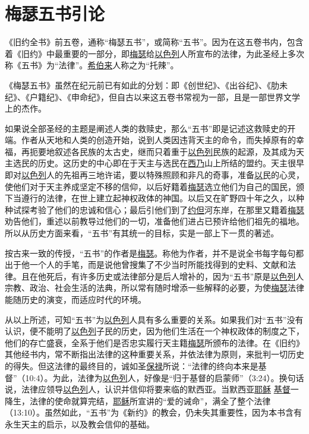 \chapter{梅瑟五书引论}

《旧约全书》前五卷，通称“梅瑟五书”，或简称“五书”。因为在这五卷书内，包含着《旧约》中最重要的一部分，即\uline{梅瑟}给\uline{以色列}人所宣布的法律，为此圣经上多次称《五书》为“法律”。\uline{希伯来}人称之为“托辣”。

《梅瑟五书》虽然在纪元前已有如此的分划：即《创世纪》、《出谷纪》、《肋未纪》、《户籍纪》、《申命纪》，但自古以来这五卷书常视为一部，且是一部世界文学上的杰作。

如果说全部圣经的主题是阐述人类的救赎史，那么“五书”即是记述这救赎史的开端。作者从天地和人类的创造开始，说到人类因违背天主的命令，而失掉原有的幸福，再扼要地叙述各民族的太古史，继而只着重于\uline{以色列}民族的起源，及其成为天主选民的历史。这历史的中心即在于天主与选民在\uline{西乃}山上所结的盟约。天主很早即对\uline{以色列}人的先祖再三地许诺，要以特殊照顾和非凡的奇事，准备\uline{以}民的心灵，使他们对于天主养成坚定不移的信仰，以后好籍着\uline{梅瑟}选立他们为自己的国民，颁下当遵行的法律，在世上建立起神权政体的神国。以后又在旷野四十年之久，以种种试探考验了他们的忠诚和信心；最后引他们到了\uline{约但}河东岸，在那里又籍着\uline{梅瑟}劝告他们，重述以前教导过他们的一切，准备他们进占已预许给他们祖先的福地。所以从历史方面来看，“五书”有其统一的目标，实是一部上下一贯的著述。

按古来一致的传授，“五书”的作者是\uline{梅瑟}。称他为作者，并不是说全书每字每句都出于他一个人的手笔，而是说他曾搜集了不少当时所能找得到的史料、文献和法律。且在他死后，有许多历史或法律部分是后人增补的，因为“五书”原是\uline{以色列}人宗教、政治、社会生活的法典，所以常有随时增添一些解释的必要，为使\uline{梅瑟}法律能随历史的演变，而适应时代的环境。

从以上所述，可知“五书”为\uline{以色列}人具有多么重要的关系。如果我们对“五书”没有认识，便不能明了\uline{以色列}子民的历史，因为他们生活在一个神权政体的制度之下，他们的存亡盛衰，全系于他们是否忠实履行天主籍\uline{梅瑟}所颁布的法律。在《旧约》其他经书内，常不断指出法律的这种重要关系，并依法律为原则，来批判一切历史的得失。但这法律的最终目的，诚如圣\uline{保禄}所说：“法律的终向本来是基督”（10:4）。为此，法律为\uline{以色列}人，好像是“归于基督的启蒙师”（3:24）。换句话说，法律应领导\uline{以色列}人，认识并信仰将要来临的默西亚。当默西亚\uline{耶稣} \uline{基督}一降生，法律的使命就算完结，\uline{耶稣}所宣讲的“爱的诫命”，满全了整个法律（13:10）。虽然如此，“五书”为《新约》的教会，仍未失其重要性，因为本书含有永生天主的启示，以及教会信仰的基础。